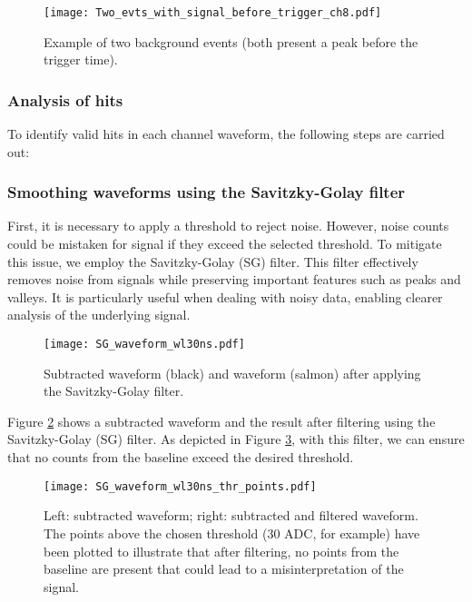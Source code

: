\documentclass[11pt,a4paper,english,oneside, pdf]{article}
\begin{document}
	\begin{figure}[!h]
		\begin{center}
			\texttt{[image: Two\_evts\_with\_signal\_before\_trigger\_ch8.pdf]}
			\caption{Example of two background events (both present a peak before the trigger time).}
			\label{fig:Two_evts_with_signal_before_trigger_ch8}
		\end{center}
	\end{figure}
	
	\subsubsection{Analysis of hits}
	
	To identify valid hits in each channel waveform, the following steps are carried out:
	
	\subsubsection*{Smoothing waveforms using the Savitzky-Golay filter}
	
	First, it is necessary to apply a threshold to reject noise. However, noise counts could be mistaken for signal if they exceed the selected threshold. To mitigate this issue, we employ the Savitzky-Golay (SG) filter. This filter effectively removes noise from signals while preserving important features such as peaks and valleys. It is particularly useful when dealing with noisy data, enabling clearer analysis of the underlying signal.
	
	\begin{figure}[!h]
		\begin{center}
			\texttt{[image: SG\_waveform\_wl30ns.pdf]}
			\caption{Subtracted waveform (black) and waveform (salmon) after applying the Savitzky-Golay filter.}
			\label{fig:SG_waveform}
		\end{center}
	\end{figure}
	
	Figure \ref{fig:SG_waveform} shows a subtracted waveform and the result after filtering using the Savitzky-Golay (SG) filter. As depicted in Figure \ref{fig:SG_waveform_thr}, with this filter, we can ensure that no counts from the baseline exceed the desired threshold.
	
	\begin{figure}[!h]
		\begin{center}
			\texttt{[image: SG\_waveform\_wl30ns\_thr\_points.pdf]}
			\caption{Left: subtracted waveform; right: subtracted and filtered waveform. The points above the chosen threshold (30 ADC, for example) have been plotted to illustrate that after filtering, no points from the baseline are present that could lead to a misinterpretation of the signal.}
			\label{fig:SG_waveform_thr}
		\end{center}
	\end{figure}
	
\end{document}
